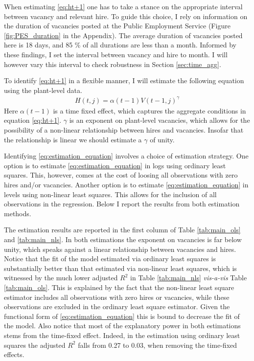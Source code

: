 When estimating \eqref{eq:ht+1} one has to take a stance on the appropriate interval between vacancy and relevant hire. To guide this choice, I rely on information on the duration of vacancies posted at the Public Employment Service (Figure \ref{fig:PES_duration} in the Appendix). The average duration of vacancies posted here is 18 days, and 85 \% of all durations are less than a month. Informed by these findings, I set the interval between vacancy and hire to month. I will however vary this interval to check robustness in Section \ref{sec:time_agg}.

To identify \eqref{eq:ht+1} in a flexible manner, I will estimate the following equation using the plant-level data.
\begin{align}
H(t,j)=\alpha(t-1) V(t-1,j)^{\gamma}
\label{eq:estimation_equation}
\end{align}
Here $\alpha(t-1)$ is a time fixed effect, which captures the aggregate conditions in equation \eqref{eq:ht+1}. $\gamma$ is an exponent on plant-level vacancies, which allows for the possibility of a non-linear relationship between hires and vacancies. Insofar that the relationship is linear we should estimate a $\gamma$ of unity.

Identifying \eqref{eq:estimation_equation} involves a choice of estimation strategy. One option is to estimate \eqref{eq:estimation_equation} in logs using ordinary least squares. This, however, comes at the cost of loosing all observations with zero hires and/or vacancies. Another option is to estimate \eqref{eq:estimation_equation} in levels using non-linear least squares. This allows for the inclusion of all observations in the regression. Below I report the results from both estimation methods. %

The estimation results are reported in the first column of Table \ref{tab:main_ols} and \ref{tab:main_nls}. In both estimations the exponent on vacancies is far below unity, which speaks against a linear relationship between vacancies and hires. Notice that the fit of the model estimated via ordinary least squares is substantially better than that estimated via non-linear least squares, which is witnessed by the much lower adjusted $R^2$ in Table \ref{tab:main_nls} \emph{vis-a-vis} Table \ref{tab:main_ols}. This is explained by the fact that the non-linear least square estimator includes all observations with zero hires or vacancies, while these observations are excluded in the ordinary least square estimator. Given the functional form of \ref{eq:estimation_equation} this is bound to decrease the fit of the model. Also notice that most of the explanatory power in both estimations stems from the time-fixed effect. Indeed, in the estimation using ordinary least squares the adjusted $R^2$ falls from 0.27 to 0.03, when removing the time-fixed effects. 

